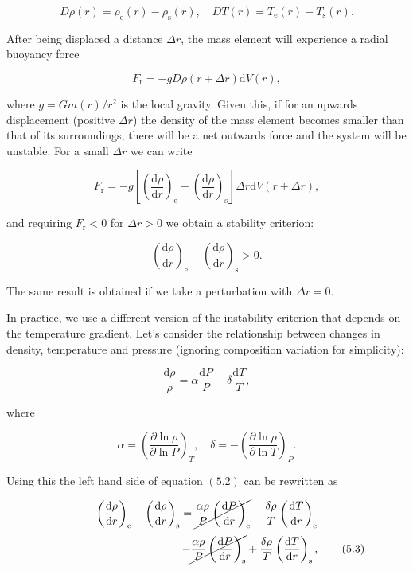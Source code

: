 \documentclass[twocolumn]{article}
\begin{document}
\[D\rho(r)=\rho_\mathrm{e}(r)-\rho_\mathrm{s}(r), \quad DT(r)=T_\mathrm{e}(r)-T_\mathrm{s}(r).\]

After being displaced a distance \(\Delta r\), the mass element will
experience a radial buoyancy force

\[F_\mathrm{r}=-g D\rho(r+\Delta r)\mathrm{d}V(r),\]

where \(g=Gm(r)/r^2\) is the local gravity. Given this, if for an
upwards displacement (positive \(\Delta r\)) the density of the mass
element becomes smaller than that of its surroundings, there will be a
net outwards force and the system will be unstable. For a small
\(\Delta r\) we can write

\[F_\mathrm{r}=-g\left[\left(\frac{\mathrm{d}\rho}{\mathrm{d}r}\right)_\mathrm{e}-\left(\frac{\mathrm{d}\rho}{\mathrm{d}r}\right)_\mathrm{s}\right]\Delta r \mathrm{d}V(r+\Delta r),\tag{5.1}\]

and requiring \(F_\mathrm{r}<0\) for \(\Delta r>0\) we obtain a
stability criterion:

\[\left(\frac{\mathrm{d}\rho}{\mathrm{d}r}\right)_\mathrm{e}-\left(\frac{\mathrm{d}\rho}{\mathrm{d}r}\right)_\mathrm{s}>0.\tag{5.2}\]

The same result is obtained if we take a perturbation with
\(\Delta r=0.\)

In practice, we use a different version of the instability criterion
that depends on the temperature gradient. Let's consider the
relationship between changes in density, temperature and pressure
(ignoring composition variation for simplicity):

\[\frac{\mathrm{d}\rho}{\rho}=\alpha\frac{\mathrm{d}P}{P}-\delta\frac{\mathrm{d}T}{T},\]

where

\[\alpha=\left(\frac{\partial \ln\rho}{\partial \ln P}\right)_T,\quad \delta=-\left(\frac{\partial \ln \rho}{\partial \ln T}\right)_P.\]

Using this the left hand side of equation \((5.2)\) can be rewritten as

\[\left(\frac{\mathrm{d}\rho}{\mathrm{d}r}\right)_\mathrm{e}-\left(\frac{\mathrm{d}\rho}{\mathrm{d}r}\right)_\mathrm{s}=\cancel{\frac{\alpha\rho}{P}\left(\frac{\mathrm{d}P}{\mathrm{d}r}\right)_\mathrm{e}} - \frac{\delta\rho}{T}\left(\frac{\mathrm{d}T}{\mathrm{d}r}\right)_\mathrm{e}\]
\[\qquad\qquad\qquad\qquad\qquad\qquad- \cancel{\frac{\alpha\rho}{P}\left(\frac{\mathrm{d}P}{\mathrm{d}r}\right)_\mathrm{s}} + \frac{\delta\rho}{T}\left(\frac{\mathrm{d}T}{\mathrm{d}r}\right)_\mathrm{s},\tag{5.3}\]
\end{document}
